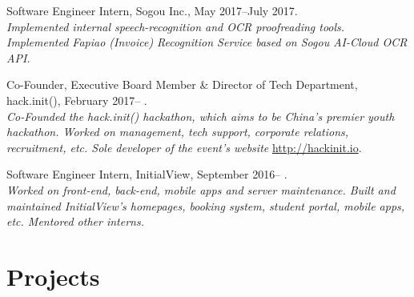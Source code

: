 \documentclass[letterpaper]{article}
\renewenvironment{itemize}{
  \begin{list}{}{
    \setlength{\leftmargin}{1.5em}
  }
}{
  \end{list}
}
\begin{document}
\begin{itemize}
  \item Software Engineer Intern, Sogou Inc., May 2017--July 2017.\\
  \emph{Implemented internal speech-recognition and OCR proofreading tools. Implemented Fapiao (Invoice) Recognition Service based on Sogou AI-Cloud OCR API.}

  \item Co-Founder, Executive Board Member \& Director of Tech Department, hack.init(), February 2017-- .\\
  \emph{Co-Founded the hack.init() hackathon, which aims to be China's premier youth hackathon. Worked on management, tech support, corporate relations, recruitment, etc. Sole developer of the event's website }\url{http://hackinit.io}{.}

  \item Software Engineer Intern, InitialView, September 2016-- .\\
  \emph{Worked on front-end, back-end, mobile apps and server maintenance. Built and maintained InitialView's homepages, booking system, student portal, mobile apps, etc. Mentored other interns.}
\end{itemize}


\section*{Projects}
\end{document}
